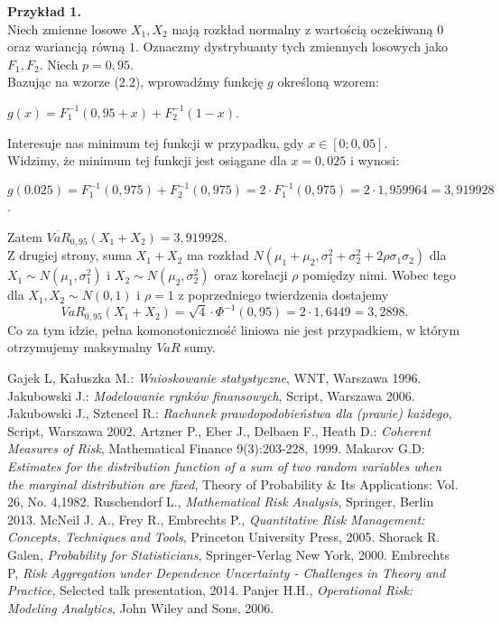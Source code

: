 \documentclass[12pt,a4paper,openany]{book}
\begin{document}
\noindent \textbf{Przykład 1.}\\
Niech zmienne losowe $X_{1}, X_{2}$ mają rozkład normalny z wartością oczekiwaną $0$ oraz wariancją równą $1$. Oznaczmy dystrybuanty tych zmiennych losowych jako $F_{1}, F_{2}$.  Niech $p = 0,95$. \\
Bazując na wzorze (2.2), wprowadźmy funkcję $g$ określoną wzorem: \
\begin{center}
$g(x) = F^{-1}_{1}(0,95+x) + F^{-1}_{2}(1-x)$. 
\end{center}
Interesuje nas minimum tej funkcji w przypadku, gdy $x \in [0;0,05]$.\\
\noindent Widzimy, że minimum tej funkcji jest osiągane dla $x= 0,025$ i wynosi:
\begin{center}
$g(0.025) = F^{-1}_{1}(0,975) + F^{-1}_{2}(0,975) = 2 \cdot F^{-1}_{1}(0,975) = 2 \cdot 1,959964 = 3,919928$.
\end{center}
Zatem $\overline{VaR}_{0,95}(X_{1}+X_{2}) = 3,919928$.\\
Z drugiej strony, suma $X_{1} +X_{2}$ ma rozkład $N(\mu_{1} + \mu_{2},\sigma_{1}^{2} + \sigma_{2}^{2} + 2\rho\sigma_{1}\sigma_{2})$ dla $X_{1} \sim N(\mu_{1},\sigma_{1}^{2})$ i $X_{2} \sim N(\mu_{2},\sigma_{2}^{2})$ oraz korelacji $\rho$ pomiędzy nimi. Wobec tego dla $X_{1}, X_{2} \sim N(0,1)$ i $\rho = 1$ z poprzedniego twierdzenia dostajemy
\begin{equation}
VaR_{0,95}(X_{1}+X_{2}) = \sqrt{4} \cdot \Phi^{-1}(0,95) = 2 \cdot 1,6449 = 3,2898. \nonumber
\end{equation}
Co za tym idzie, pełna komonotoniczność liniowa nie jest przypadkiem, w którym otrzymujemy maksymalny $VaR$ sumy.


\begin{thebibliography}{a,b,c}
\bibitem[1]{}  Gajek L, Kałuszka M.: {\it Wnioskowanie statystyczne}, WNT, Warszawa 1996.
\bibitem[2]{}  Jakubowski J.: {\it Modelowanie rynków finansowych}, Script, Warszawa 2006.
\bibitem[3]{}  Jakubowski J., Sztencel R.: {\it Rachunek prawdopodobieństwa dla (prawie) każdego}, Script, Warszawa 2002.
\bibitem[4]{}  Artzner P., Eber J., Delbaen F., Heath D.: {\it Coherent Measures of Risk}, Mathematical Finance 9(3):203-228, 1999.
\bibitem[5]{}  Makarov G.D: {\it Estimates for the distribution function of a sum of two random variables when the marginal distribution are fixed}, Theory of Probability \& Its Applications: Vol. 26, No. 4,1982.
\bibitem[5]{}  Ruschendorf L., {\it Mathematical Risk Analysis}, Springer, Berlin 2013.
\bibitem[6]{}  McNeil J. A., Frey R., Embrechts P., {\it Quantitative Risk Management: Concepts, Techniques and Tools}, Princeton University Press, 2005.
\bibitem[7]{}  Shorack R. Galen, {\it Probability for Statisticians}, Springer-Verlag New York, 2000.
\bibitem[8]{}  Embrechts P, {\it Risk Aggregation under Dependence Uncertainty - Challenges in Theory and Practice}, Selected talk presentation, 2014.
\bibitem[9]{}  Panjer H.H., {\it Operational Risk: Modeling Analytics}, John Wiley and Sons, 2006.

\end{thebibliography}
\end{document}

